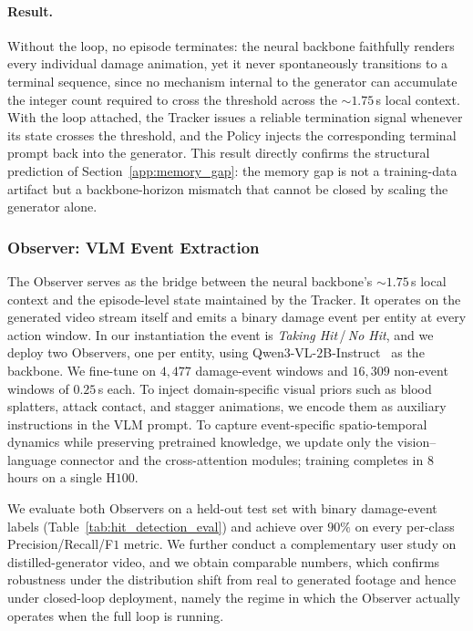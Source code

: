 \paragraph{Result.}
Without the loop, no episode terminates: the neural backbone faithfully renders every individual damage animation, yet it never spontaneously transitions to a terminal sequence, since no mechanism internal to the generator can accumulate the integer count required to cross the threshold across the ${\sim}1.75$\,s local context. With the loop attached, the Tracker issues a reliable termination signal whenever its state crosses the threshold, and the Policy injects the corresponding terminal prompt back into the generator. This result directly confirms the structural prediction of Section~\ref{app:memory_gap}: the memory gap is not a training-data artifact but a backbone-horizon mismatch that cannot be closed by scaling the generator alone.

\subsubsection{Observer: VLM Event Extraction}
\label{app:hitdet}

The Observer serves as the bridge between the neural backbone's ${\sim}1.75$\,s local context and the episode-level state maintained by the Tracker. It operates on the generated video stream itself and emits a binary damage event per entity at every action window. In our instantiation the event is \emph{Taking Hit}\,/\,\emph{No Hit}, and we deploy two Observers, one per entity, using Qwen3-VL-$2$B-Instruct~\citep{qwen2024} as the backbone. We fine-tune on $4{,}477$ damage-event windows and $16{,}309$ non-event windows of $0.25$\,s each. To inject domain-specific visual priors such as blood splatters, attack contact, and stagger animations, we encode them as auxiliary instructions in the VLM prompt. To capture event-specific spatio-temporal dynamics while preserving pretrained knowledge, we update only the vision--language connector and the cross-attention modules; training completes in $8$ hours on a single H$100$.

We evaluate both Observers on a held-out test set with binary damage-event labels (Table~\ref{tab:hit_detection_eval}) and achieve over $90\%$ on every per-class Precision/Recall/F$1$ metric. We further conduct a complementary user study on distilled-generator video, and we obtain comparable numbers, which confirms robustness under the distribution shift from real to generated footage and hence under closed-loop deployment, namely the regime in which the Observer actually operates when the full loop is running.

